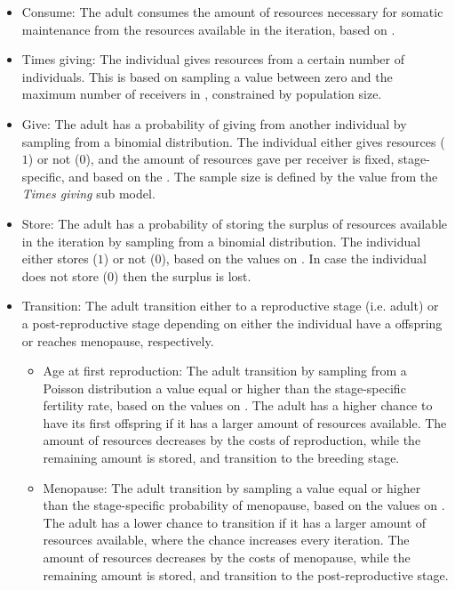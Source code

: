 \documentclass{article}
\begin{document}
\begin{itemize}
\begin{itemize}
        \item Consume: The adult consumes the amount of resources necessary for somatic maintenance from the resources available in the iteration, based on \cite{kaplan2000theory,pontzer2021daily}.
        \item Times giving: The individual gives resources from a certain number of individuals. This is based on sampling a value between zero and the maximum number of receivers in \cite{gurven2004give}, constrained by population size.
        \item Give: The adult has a probability of giving from another individual by sampling from a binomial distribution. The individual either gives resources ($1$) or not ($0$), and the amount of resources gave per receiver is fixed, stage-specific, and based on the \cite{gurven2004give}. The sample size is defined by the value from the \emph{Times giving} sub model. 
        \item Store: The adult has a probability of storing the surplus of resources available in the iteration by sampling from a binomial distribution. The individual either stores ($1$) or not ($0$), based on the values on \citep{bowles2011cultivation}. In case the individual does not store ($0$) then the surplus is lost.
        \item Transition: The adult transition either to a reproductive stage (i.e. adult) or a post-reproductive stage depending on either the individual have a offspring or reaches menopause, respectively.
        \begin{itemize}
            \item Age at first reproduction: The adult transition by sampling from a Poisson distribution a value equal or higher than the stage-specific fertility rate, based on the values on \citep{wood2017dynamics}. The adult has a higher chance to have its first offspring if it has a larger amount of resources available. The amount of resources decreases by the costs of reproduction, while the remaining amount is stored, and transition to the breeding stage.
            \item Menopause: The adult transition by sampling a value equal or higher than the stage-specific probability of menopause, based on the values on \citep{laisk2019demographic}. The adult has a lower chance to transition if it has a larger amount of resources available, where the chance increases every iteration. The amount of resources decreases by the costs of menopause, while the remaining amount is stored, and transition to the post-reproductive stage.

\end{itemize}
\end{itemize}
\end{itemize}
\end{document}
